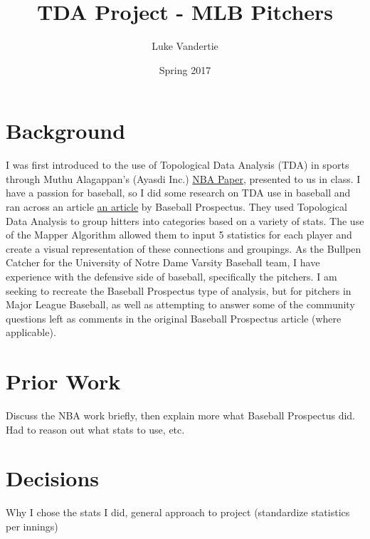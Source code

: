 \documentclass{article}
\title{TDA Project - MLB Pitchers}
\author{Luke Vandertie}
\date{Spring 2017}
\begin{document}
\maketitle
\section{Background}

I was first introduced to the use of Topological Data Analysis (TDA) in sports through Muthu Alagappan's (Ayasdi Inc.) \href{http://www.sloansportsconference.com/wp-content/uploads/2012/03/Alagappan-Muthu-EOSMarch2012PPT.pdf}{NBA Paper}, presented to us in class.  I have a passion for baseball, so I did some research on TDA use in baseball and ran across an article \href{http://www.baseballprospectus.com/article.php?articleid=26142#commentMessage}{an article} by Baseball Prospectus.  They used Topological Data Analysis to group hitters into categories based on a variety of stats.  The use of the Mapper Algorithm allowed them to input 5 statistics for each player and create a visual representation of these connections and groupings.  As the Bullpen Catcher for the University of Notre Dame Varsity Baseball team, I have experience with the defensive side of baseball, specifically the pitchers.  I am seeking to recreate the Baseball Prospectus type of analysis, but for pitchers in Major League Baseball, as well as attempting to answer some of the community questions left as comments in the original Baseball Prospectus article (where applicable).  

\section{Prior Work}

Discuss the NBA work briefly, then explain more what Baseball Prospectus did.  Had to reason out what stats to use, etc.

\section{Decisions}

Why I chose the stats I did, general approach to project (standardize statistics per innings)
\end{document}
